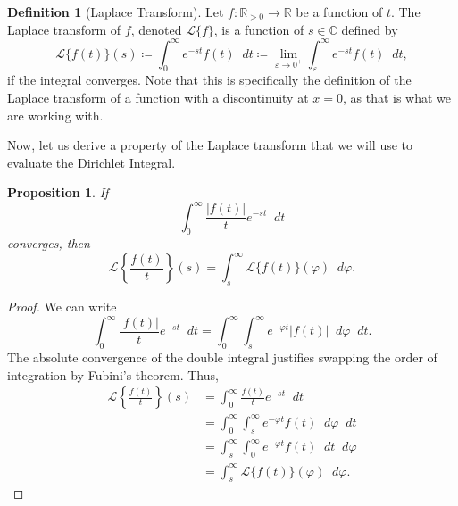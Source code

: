 \documentclass[a4paper]{article}
\newcommand*\diff{\mathop{}\!d} %
\newtheorem{proposition}[theorem]{Proposition}
\theoremstyle{definition}
\newtheorem{definition}{Definition}
\begin{document}
\begin{definition}[Laplace Transform]
    Let $f: \mathbb{R}_{>0} \to \mathbb{R}$ be a function of $t$.
    The Laplace transform of $f$, denoted $\mathscr{L}\{f\}$, is a function of $s \in \mathbb{C}$ defined by
    \begin{equation}
        \mathscr{L} \{f(t)\}(s) \coloneq \int_{0}^{\infty} e^{-st} f(t) \diff t \coloneq \lim_{\varepsilon \to 0^+} \int_{\varepsilon}^{\infty} e^{-st} f(t) \diff t,
    \end{equation}
    if the integral converges.
    Note that this is specifically the definition of the Laplace transform of a function with a discontinuity at $x=0$, as that is what we are working with.
\end{definition}
Now, let us derive a property of the Laplace transform that we will use to evaluate the Dirichlet Integral.
\begin{proposition} \label{thm:Laplace property proposition}
    If
    \begin{equation*}
        \int_{0}^{\infty} \frac{|f(t)|}{t} e^{-st} \diff t
    \end{equation*}
    converges, then
    \begin{equation}
        \mathscr{L} \left\{\frac{f(t)}{t}\right\}(s) = \int_{s}^{\infty} \mathscr{L}\{f(t)\}(\varphi) \diff \varphi.
    \end{equation}
\end{proposition}
\begin{proof}
    We can write
    \begin{equation*}
        \int_{0}^{\infty} \frac{|f(t)|}{t} e^{-st} \diff t = \int_{0}^{\infty} \int_{s}^{\infty} e^{-\varphi t} |f(t)| \diff \varphi \diff t.
    \end{equation*}
    The absolute convergence of the double integral justifies swapping the order of integration by Fubini's theorem.
    Thus,
    \begin{align*}
        \mathscr{L} \left\{\frac{f(t)}{t}\right\}(s) & = \int_{0}^{\infty} \frac{f(t)}{t} e^{-st} \diff t                              \\
                                                     & = \int_{0}^{\infty} \int_{s}^{\infty} e^{-\varphi t} f(t) \diff \varphi \diff t \\
                                                     & = \int_{s}^{\infty} \int_{0}^{\infty} e^{-\varphi t} f(t) \diff t \diff \varphi \\
                                                     & = \int_{s}^{\infty} \mathscr{L}\{f(t)\}(\varphi) \diff \varphi.
    \end{align*}
\end{proof}
\end{document}

